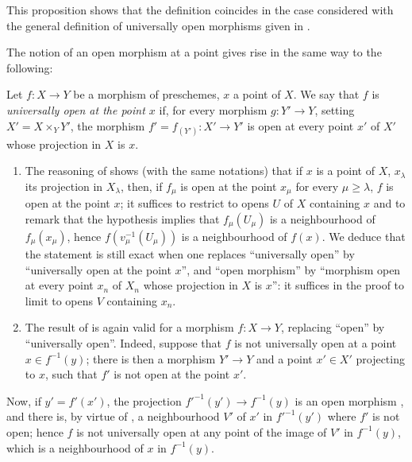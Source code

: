 This proposition shows that the definition  coincides in the case considered with the general definition of universally open morphisms given in .

The notion of an open morphism at a point  gives rise in the same way to the following:

\begin{definition}[14.3.3]
\label{IV.14.3.3}
Let $f:X\to Y$ be a morphism of preschemes, $x$ a point of $X$.
We say that $f$ is \emph{universally open at the point $x$} if, for every morphism $g:Y'\to Y$, setting $X'=X\times_Y Y'$, the morphism $f'=f_{(Y')}:X'\to Y'$ is open at every point $x'$ of $X'$ whose projection in $X$ is $x$.
\end{definition}

\begin{remarks}[14.3.3.1]
\label{IV.14.3.3.1}
\begin{enumerate}[label=(\roman*)]
  \item The reasoning of  shows (with the same notations) that if $x$ is a point of $X$, $x_\lambda$ its projection in $X_\lambda$, then, if $f_\mu$ is open at the point $x_\mu$ for every $\mu\geq\lambda$, $f$ is open at the point $x$; it suffices to restrict to opens $U$ of $X$ containing $x$ and to remark that the hypothesis implies that $f_\mu(U_\mu)$ is a neighbourhood of $f_\mu(x_\mu)$, hence $f(v_\mu^{-1}(U_\mu))$ is a neighbourhood of $f(x)$.
  We deduce that the statement  is still exact when one replaces ``universally open'' by ``universally open at the point $x$'', and ``open morphism'' by ``morphism open at every point $x_n$ of $X_n$ whose projection in $X$ is $x$'': it suffices in the proof to limit to opens $V$ containing $x_n$.

  \item The result of  is again valid for a morphism $f:X\to Y$, replacing ``open'' by ``universally open''.
  Indeed, suppose that $f$ is not universally open at a point $x\in f^{-1}(y)$; there is then a morphism $Y'\to Y$ and a point $x'\in X'$ projecting to $x$, such that $f'$ is not open at the point $x'$.
\end{enumerate}
\end{remarks}


Now, if $y'=f'(x')$, the projection $f'^{-1}(y')\to f^{-1}(y)$ is an open morphism , and there is, by virtue of , a neighbourhood $V'$ of $x'$ in $f'^{-1}(y')$ where $f'$ is not open; hence $f$ is not universally open at any point of the image of $V'$ in $f^{-1}(y)$, which is a neighbourhood of $x$ in $f^{-1}(y)$.

